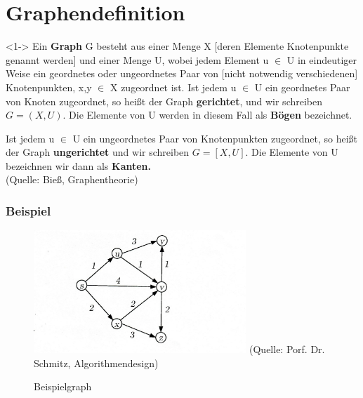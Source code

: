 \section{Graphendefinition}

\begin{frame}
	\begin{block}<1->{}
				Ein \textbf{Graph} G besteht aus einer Menge X [deren Elemente Knotenpunkte genannt werden] und einer Menge U, wobei jedem Element u $\in$ U in eindeutiger Weise ein geordnetes oder ungeordnetes Paar von [nicht notwendig verschiedenen] Knotenpunkten, x,y $\in$ X zugeordnet ist.
				Ist jedem u $\in$ U ein geordnetes Paar von Knoten zugeordnet, so heißt der Graph \textbf{gerichtet}, und wir schreiben 
				$G= (X, U)$.
				Die Elemente von U werden in diesem Fall als \textbf{Bögen} bezeichnet.

				Ist jedem u $\in$ U ein ungeordnetes Paar von Knotenpunkten zugeordnet, so heißt der Graph \textbf{ungerichtet} und wir schreiben 
				$G=[X,U]$. 
				Die Elemente von U bezeichnen wir dann als \textbf{Kanten.} \\
				\tiny (Quelle: Bieß, Graphentheorie)
	\end{block}
\end{frame}

\begin{frame}
\frametitle{Beispiel}
	\begin{figure}[h]
\centering
\includegraphics[width = 8cm]{./pictures/00_Graph.jpg}
\tiny (Quelle: Porf. Dr. Schmitz, Algorithmendesign)
\\
\caption{Beispielgraph}



\label{a1}
\end{figure}
\end{frame}
	
